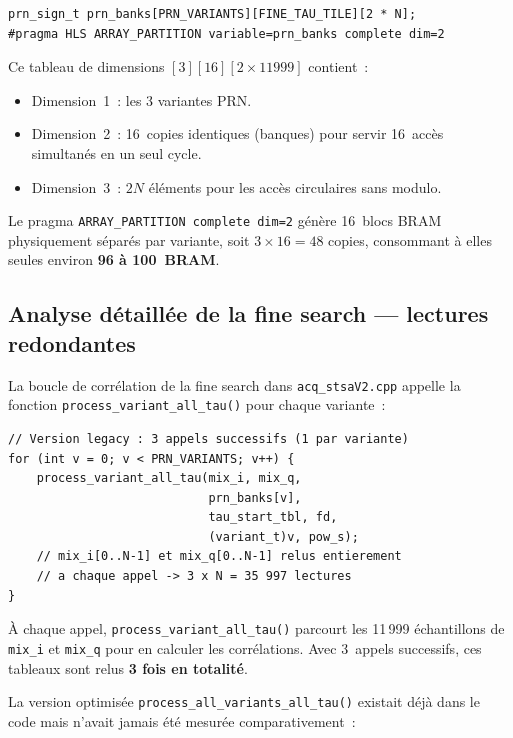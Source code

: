 \documentclass[11pt,a4paper]{article}
\begin{document}
\begin{lstlisting}[caption={Déclaration de prn\_banks dans acq\_stsaV2.cpp}]
prn_sign_t prn_banks[PRN_VARIANTS][FINE_TAU_TILE][2 * N];
#pragma HLS ARRAY_PARTITION variable=prn_banks complete dim=2
\end{lstlisting}

Ce tableau de dimensions $[3][16][2 \times 11999]$ contient~:
\begin{itemize}
  \item Dimension~1~: les 3 variantes PRN.
  \item Dimension~2~: 16~copies identiques (banques) pour servir 16~accès simultanés en un seul cycle.
  \item Dimension~3~: $2N$ éléments pour les accès circulaires sans modulo.
\end{itemize}

Le pragma \texttt{ARRAY\_PARTITION complete dim=2} génère 16~blocs BRAM physiquement séparés par variante, soit $3 \times 16 = 48$ copies, consommant à elles seules environ \textbf{96 à 100~BRAM}.

\subsection{Analyse détaillée de la fine search --- lectures redondantes}

La boucle de corrélation de la fine search dans \texttt{acq\_stsaV2.cpp} appelle la fonction \texttt{process\_variant\_all\_tau()} pour chaque variante~:

\begin{lstlisting}[caption={Version lente --- relecture $\times3$ dans produce\_fine\_powers()}]
// Version legacy : 3 appels successifs (1 par variante)
for (int v = 0; v < PRN_VARIANTS; v++) {
    process_variant_all_tau(mix_i, mix_q,
                            prn_banks[v],
                            tau_start_tbl, fd,
                            (variant_t)v, pow_s);
    // mix_i[0..N-1] et mix_q[0..N-1] relus entierement
    // a chaque appel -> 3 x N = 35 997 lectures
}
\end{lstlisting}

À chaque appel, \texttt{process\_variant\_all\_tau()} parcourt les 11\,999 échantillons de \texttt{mix\_i} et \texttt{mix\_q} pour en calculer les corrélations. Avec 3~appels successifs, ces tableaux sont relus \textbf{3 fois en totalité}.

La version optimisée \texttt{process\_all\_variants\_all\_tau()} existait déjà dans le code mais n'avait jamais été mesurée comparativement~:
\end{document}
